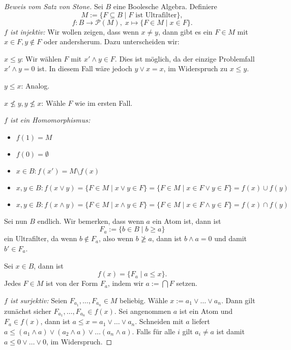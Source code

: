\begin{proof}[Beweis vom Satz von Stone]
    Sei $B$ eine Boolesche Algebra. Definiere
    $$ M := \{ F \subseteq B \mid F \text{ ist Ultrafilter} \}, $$
    $$ f : B \to \mathcal{P}(M), \; x \mapsto \{ F \in M \mid x \in F \}. $$
    \textit{$f$ ist injektiv:} Wir wollen zeigen, dass wenn $x \neq y$, dann gibt es ein $F \in M$ mit $x \in F, y \notin F$ oder andersherum. Dazu unterscheiden wir:

    $ x \leq y $: Wir wählen $F$ mit $x' \land y \in F$. Dies ist möglich, da der einzige Problemfall $x' \land y = 0$ ist. In diesem Fall wäre jedoch $y \lor x = x$, im Widerspruch zu $x \leq y$.

    $ y \leq x $: Analog.

    $ x \nleq y, y \nleq x $: Wähle $F$ wie im ersten Fall.

    \textit{$f$ ist ein Homomorphismus:}
    \begin{itemize}
        \item $f(1) = M$
        \item $f(0) = \emptyset$
        \item $x \in B: f(x') = M \setminus f(x)$
        \item $x, y \in B: f(x \lor y) = \{ F \in M \mid x \lor y \in F \} = \{ F \in M \mid x \in F \lor y \in F \} = f(x) \cup f(y)$
        \item $x, y \in B: f(x \land y) = \{ F \in M \mid x \land y \in F \} = \{ F \in M \mid x \in F \land y \in F \} = f(x) \cap f(y)$
    \end{itemize}

    Sei nun $B$ endlich. Wir bemerken, dass wenn $a$ ein Atom ist, dann ist
    $$ F_a := \{ b \in B \mid b \geq a \} $$
    ein Ultrafilter, da wenn $b \notin F_a$, also wenn $b \ngeq a$, dann ist $b \land a = 0$ und damit $b' \in F_a$.

    Sei $x \in B$, dann ist
    $$ f(x) = \{ F_a \mid a \leq x \}. $$
    Jedes $F \in M$ ist von der Form $F_a$, indem wir $a := \bigcap F$ setzen.

    \textit{$f$ ist surjektiv:} Seien $F_{a_1}, \hdots, F_{a_n} \in M$ beliebig. Wähle $x := a_1 \lor \hdots \lor a_n$. Dann gilt zunächst sicher $F_{a_1}, \hdots, F_{a_n} \in f(x)$. Sei angenommen $a$ ist ein Atom und $F_a \in f(x)$, dann ist $a \leq x = a_1 \lor \hdots \lor a_n$. Schneiden mit $a$ liefert $a \leq (a_1 \land a) \lor (a_2 \land a) \lor \hdots (a_n \land a)$. Falls für alle $i$ gilt $a_i \neq a$ ist damit $a \leq 0 \lor \hdots \lor 0$, im Widerspruch.
\end{proof}